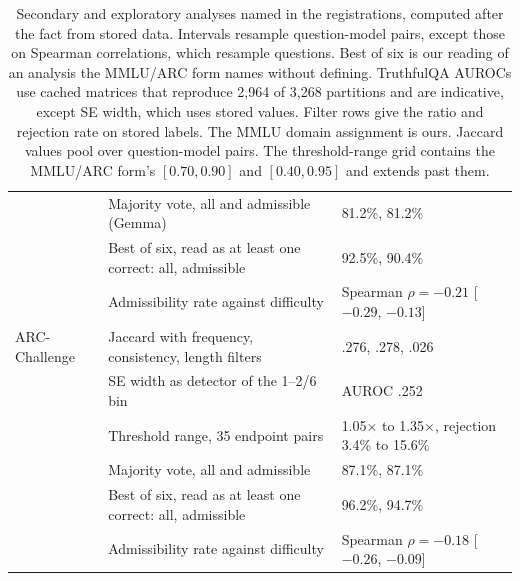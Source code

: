 \begin{table}[h]
\begin{tabular}{lp{5.4cm}p{6.2cm}}
 & Majority vote, all and admissible (Gemma) & 81.2\%, 81.2\% \\
 & Best of six, read as at least one correct: all, admissible & 92.5\%, 90.4\% \\
 & Admissibility rate against difficulty & Spearman $\rho=-0.21$ [$-0.29$, $-0.13$] \\
ARC-Challenge & Jaccard with frequency, consistency, length filters & .276, .278, .026 \\
 & SE width as detector of the 1--2/6 bin & AUROC .252 \\
 & Threshold range, 35 endpoint pairs & 1.05$\times$ to 1.35$\times$, rejection 3.4\% to 15.6\% \\
 & Majority vote, all and admissible & 87.1\%, 87.1\% \\
 & Best of six, read as at least one correct: all, admissible & 96.2\%, 94.7\% \\
 & Admissibility rate against difficulty & Spearman $\rho=-0.18$ [$-0.26$, $-0.09$] \\
\bottomrule
\end{tabular}
\caption{Secondary and exploratory analyses named in the registrations, computed after the fact from stored data. Intervals resample question-model pairs, except those on Spearman correlations, which resample questions. Best of six is our reading of an analysis the MMLU/ARC form names without defining. TruthfulQA AUROCs use cached matrices that reproduce 2,964 of 3,268 partitions and are indicative, except SE width, which uses stored values. Filter rows give the ratio and rejection rate on stored labels. The MMLU domain assignment is ours. Jaccard values pool over question-model pairs. The threshold-range grid contains the MMLU/ARC form's $[0.70, 0.90]$ and $[0.40, 0.95]$ and extends past them.}
\label{tab:registered-analyses}
\end{table}
